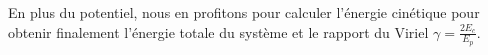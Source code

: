 		En plus du potentiel, nous en profitons pour calculer l'énergie cinétique pour obtenir finalement
		l'énergie totale du système et le rapport du Viriel $\gamma = \frac{2E_c}{E_p}$.



